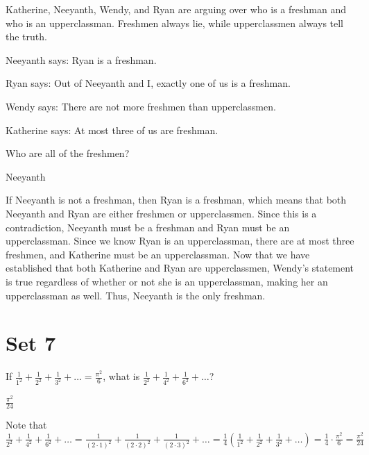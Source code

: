 \documentclass[11pt]{article}
\begin{document}
\begin{problem}
Katherine, Neeyanth, Wendy, and Ryan are arguing over who is a freshman and who is an upperclassman. Freshmen always lie, while upperclassmen always tell the truth. 
    
Neeyanth says: Ryan is a freshman.
    
Ryan says: Out of Neeyanth and I, exactly one of us is a freshman.

Wendy says: There are not more freshmen than upperclassmen.
    
Katherine says: At most three of us are freshman.
    
\noindent Who are all of the freshmen? %
\end{problem}

\begin{answer}
Neeyanth
\end{answer}

\begin{solution}
If Neeyanth is not a freshman, then Ryan is a freshman, which means that both Neeyanth and Ryan are either freshmen or upperclassmen. Since this is a contradiction, Neeyanth must be a freshman and Ryan must be an upperclassman. Since we know Ryan is an upperclassman, there are at most three freshmen, and Katherine must be an upperclassman. Now that we have established that both Katherine and Ryan are upperclassmen, Wendy's statement is true regardless of whether or not she is an upperclassman, making her an upperclassman as well. Thus, Neeyanth is the only freshman.
\end{solution}


\newpage
\section*{Set 7}
\begin{problem}
If $\frac{1}{1^2} + \frac{1}{2^2} + \frac{1}{3^2} + \dots = \frac{\pi^2}{6}$, what is $\frac{1}{2^2} + \frac{1}{4^2} + \frac{1}{6^2} + \ldots$?
\end{problem}

\begin{answer}
$\frac{\pi^2}{24}$
\end{answer}

\begin{solution}
Note that $\frac{1}{2^2} + \frac{1}{4^2} + \frac{1}{6^2} + \ldots = \frac{1}{(2 \cdot 1)^2} + \frac{1}{(2 \cdot 2)^2} + \frac{1}{(2 \cdot 3)^2} + \dots = \frac{1}{4}\left(\frac{1}{1^2} + \frac{1}{2^2} + \frac{1}{3^2} + \dots\right) = \frac{1}{4} \cdot \frac{\pi^2}{6} = \boxed{\frac{\pi^2}{24}}$
\end{solution}
\end{document}
